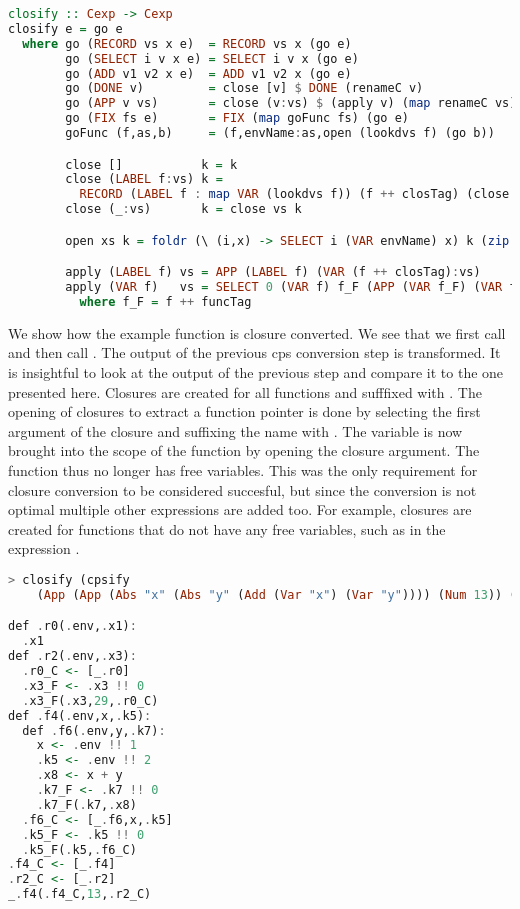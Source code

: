 {\begin{lstlisting}[language=Haskell]
closify :: Cexp -> Cexp
closify e = go e
  where go (RECORD vs x e)  = RECORD vs x (go e)
        go (SELECT i v x e) = SELECT i v x (go e)
        go (ADD v1 v2 x e)  = ADD v1 v2 x (go e)
        go (DONE v)         = close [v] $ DONE (renameC v)
        go (APP v vs)       = close (v:vs) $ (apply v) (map renameC vs)
        go (FIX fs e)       = FIX (map goFunc fs) (go e)
        goFunc (f,as,b)     = (f,envName:as,open (lookdvs f) (go b))

        close []           k = k
        close (LABEL f:vs) k =
          RECORD (LABEL f : map VAR (lookdvs f)) (f ++ closTag) (close vs k)
        close (_:vs)       k = close vs k

        open xs k = foldr (\ (i,x) -> SELECT i (VAR envName) x) k (zip [1..] xs)

        apply (LABEL f) vs = APP (LABEL f) (VAR (f ++ closTag):vs)
        apply (VAR f)   vs = SELECT 0 (VAR f) f_F (APP (VAR f_F) (VAR f:vs))
          where f_F = f ++ funcTag
\end{lstlisting}

We show how the example function  is closure converted. We see that we first call  and then call . The output of the previous cps conversion step is transformed. It is insightful to look at the output of the previous step and compare it to the one presented here. Closures are created for all functions and sufffixed with . The opening of closures to extract a function pointer is done by selecting the first argument of the closure and suffixing the name with . The variable  is now brought into the scope of the function  by opening the closure argument. The function  thus no longer has free variables. This was the only requirement for closure conversion to be considered succesful, but since the conversion is not optimal multiple other expressions are added too. For example, closures are created for functions that do not have any free variables, such as in the expression .

\begin{lstlisting}[language=Haskell]
> closify (cpsify
    (App (App (Abs "x" (Abs "y" (Add (Var "x") (Var "y")))) (Num 13)) (Num 29)))

def .r0(.env,.x1):
  .x1
def .r2(.env,.x3):
  .r0_C <- [_.r0]
  .x3_F <- .x3 !! 0
  .x3_F(.x3,29,.r0_C)
def .f4(.env,x,.k5):
  def .f6(.env,y,.k7):
    x <- .env !! 1
    .k5 <- .env !! 2
    .x8 <- x + y
    .k7_F <- .k7 !! 0
    .k7_F(.k7,.x8)
  .f6_C <- [_.f6,x,.k5]
  .k5_F <- .k5 !! 0
  .k5_F(.k5,.f6_C)
.f4_C <- [_.f4]
.r2_C <- [_.r2]
_.f4(.f4_C,13,.r2_C)
\end{lstlisting}

}

